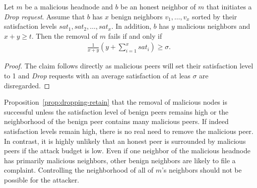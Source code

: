 \begin{proposition}
\label{prop:dropping-retain}
Let $m$ be a malicious headnode and $b$ be an honest neighbor of $m$ that initiates a \textit{Drop request}.
Assume that $b$ has $x$ benign neighbors $v_1, \ldots , v_x$ sorted by their satisfaction levels $sat_1, sat_2 ,\ldots  , sat_x$. In addition, $b$ has $y$ malicious neighbors and $x+y\geq t$.
 Then the removal of $m$ fails if and only if 
\begin{align}
\label{eq:drop-retain}
\frac{1}{x+y}\left(y+\sum_{i=1}^x sat_i\right) \geq \sigma.  
\end{align} 
\end{proposition}
\begin{proof}
The claim follows directly as malicious peers will set their satisfaction level to 1 and \textit{Drop} requests with an average satisfaction of at leas $\sigma$ are disregarded.  
\end{proof}

Proposition~\ref{prop:dropping-retain} that the removal of malicious nodes is successful unless the satisfaction level of benign peers remains high or the neighborhood of the benign peer contains many malicious peers. 
If indeed satisfaction levels remain high, there is no real need to remove the malicious peer. In contrast, it is highly unlikely that an honest peer is surrounded by malicious peers if the attack budget is low. Even if one neighbor of the malicious headnode has primarily malicious neighbors, other benign neighbors are likely to file a complaint. Controlling the neighborhood of all of $m$'s neighbors should not be possible for the attacker. 
 